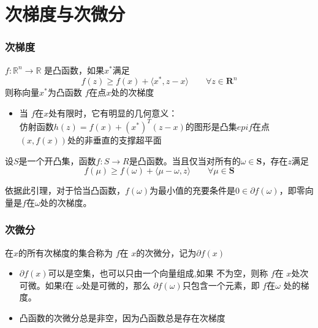 \documentclass[handout,10pt]{beamer}
\begin{document}
\section{次梯度与次微分}

\begin{frame}
	\frametitle{次梯度}	
	$f: \mathbb{R}^{n} \rightarrow \mathbb{R}$ 是凸函数，如果$x^{*}$满足
	\begin{equation}
		f(z) \geq f(x)+ \langle x^{*},z-x\rangle  \qquad\forall z \in \mathbf{R}^{n}
	\end{equation}
	则称向量$x^{*}$为凸函数 $f$在点$x$处的次梯度
	\begin{itemize}[<+->]
		\item 当 $f$在$x$处有限时，它有明显的几何意义：\\仿射函数$h(z)=f(x)+(x^{*})^{T}(z-x)$的图形是凸集$epif$在点$(x,f(x))$处的非垂直的支撑超平面
	\end{itemize}
	\begin{mytheorem}
	设$S$是一个开凸集，函数$f:S \rightarrow R$是凸函数。当且仅当对所有的$\omega \in \mathbf{S}$，存在$z$满足
		\begin{equation}
			f(\mu) \geq f(\omega)+ \langle\mu-\omega,z\rangle \qquad\forall \mu \in \mathbf{S}
		\end{equation}
	\end{mytheorem}
	依据此引理，对于恰当凸函数，$f(\omega)$为最小值的充要条件是$0 \in \partial f(\omega)$，即零向量是$f$在$\omega$处的次梯度。

\end{frame}
\begin{frame}
	\frametitle{次微分}	
	在$x$的所有次梯度的集合称为 $f$在 $x$的次微分，记为$\partial f(x)$
	\begin{itemize}[<+->]
		\item $\partial f(x)$可以是空集，也可以只由一个向量组成,如果 不为空，则称 $f$在 $x$处次可微。如果f在 $\omega$处是可微的，那么  $\partial f(\omega)$只包含一个元素，即 $f$在$\omega$ 处的梯度。
		\item 凸函数的次微分总是非空，因为凸函数总是存在次梯度
	\end{itemize}
	
\end{frame}
\end{document}
